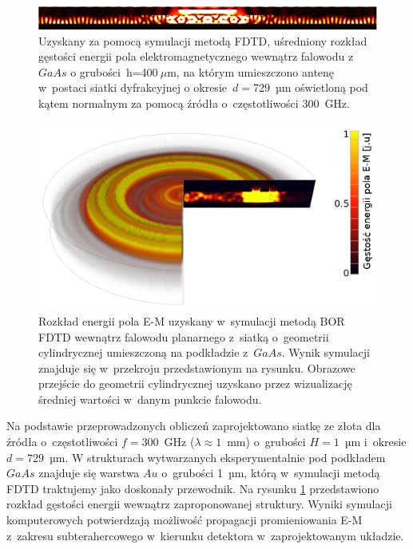 \begin{figure}[tb]
	\includegraphics[width=\textwidth]{images/thz/consrc_siatka1d_300GHz_d729um.png}
	\caption{Uzyskany za pomocą symulacji metodą FDTD, uśredniony rozkład gęstości energii pola elektromagnetycznego wewnątrz falowodu z~$GaAs$ o grubości~h=400$~\mu$m, na którym umieszczono antenę w~postaci siatki dyfrakcyjnej o okresie~$d=$729~µm oświetloną pod kątem normalnym za pomocą źródła o~częstotliwości 300~GHz.  }
	\label{fig:consrc_1d_f300Ghz}
\end{figure}

\begin{figure}[tb]
	\includegraphics[width=\textwidth]{images/antenaThz/tort.png}
	\caption{Rozkład energii pola E-M uzyskany w~symulacji metodą BOR FDTD wewnątrz falowodu planarnego z~siatką o~geometrii cylindrycznej umieszczoną na podkładzie z~$GaAs$. Wynik symulacji znajduje się w~przekroju przedstawionym na rysunku. Obrazowe przejście do geometrii cylindrycznej uzyskano przez wizualizację średniej wartości w~danym punkcie falowodu.}	
	\label{fig:concent_modfalo}
\end{figure}


Na podstawie przeprowadzonych obliczeń zaprojektowano siatkę ze złota dla źródła o~częstotliwości $f=300$~GHz ($\lambda\approx 1$~mm) o~grubości $H=1$~µm i~okresie $d=729$~µm. W strukturach wytwarzanych eksperymentalnie pod podkładem $GaAs$ znajduje się warstwa $Au$ o~grubości 1~µm, którą w~symulacji metodą FDTD traktujemy jako doskonały przewodnik. Na rysunku \ref{fig:consrc_1d_f300Ghz} przedstawiono rozkład gęstości energii wewnątrz zaproponowanej struktury. Wyniki symulacji komputerowych potwierdzają  możliwość propagacji promieniowania E-M z~zakresu subterahercowego w~kierunku detektora w~zaprojektowanym układzie.

